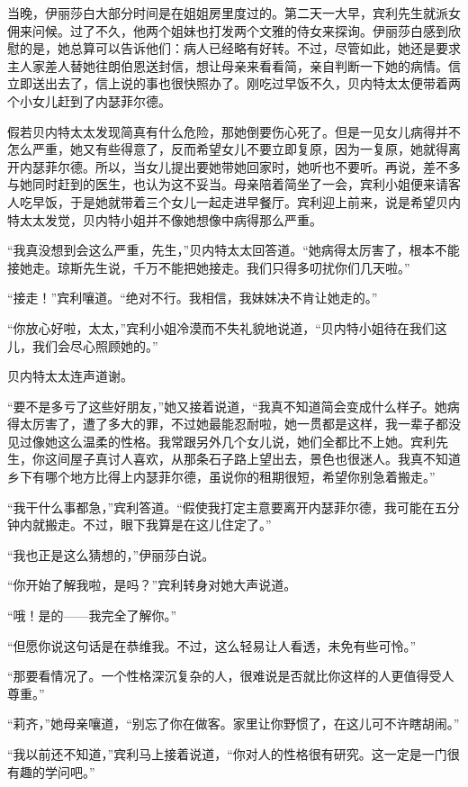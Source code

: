 \par 当晚，伊丽莎白大部分时间是在姐姐房里度过的。第二天一大早，宾利先生就派女佣来问候。过了不久，他两个姐妹也打发两个文雅的侍女来探询。伊丽莎白感到欣慰的是，她总算可以告诉他们：病人已经略有好转。不过，尽管如此，她还是要求主人家差人替她往朗伯恩送封信，想让母亲来看看简，亲自判断一下她的病情。信立即送出去了，信上说的事也很快照办了。刚吃过早饭不久，贝内特太太便带着两个小女儿赶到了内瑟菲尔德。
\par 假若贝内特太太发现简真有什么危险，那她倒要伤心死了。但是一见女儿病得并不怎么严重，她又有些得意了，反而希望女儿不要立即复原，因为一复原，她就得离开内瑟菲尔德。所以，当女儿提出要她带她回家时，她听也不要听。再说，差不多与她同时赶到的医生，也认为这不妥当。母亲陪着简坐了一会，宾利小姐便来请客人吃早饭，于是她就带着三个女儿一起走进早餐厅。宾利迎上前来，说是希望贝内特太太发觉，贝内特小姐并不像她想像中病得那么严重。
\par “我真没想到会这么严重，先生，”贝内特太太回答道。“她病得太厉害了，根本不能接她走。琼斯先生说，千万不能把她接走。我们只得多叨扰你们几天啦。”
\par “接走！”宾利嚷道。“绝对不行。我相信，我妹妹决不肯让她走的。”
\par “你放心好啦，太太，”宾利小姐冷漠而不失礼貌地说道，“贝内特小姐待在我们这儿，我们会尽心照顾她的。”
\par 贝内特太太连声道谢。
\par “要不是多亏了这些好朋友，”她又接着说道，“我真不知道简会变成什么样子。她病得太厉害了，遭了多大的罪，不过她最能忍耐啦，她一贯都是这样，我一辈子都没见过像她这么温柔的性格。我常跟另外几个女儿说，她们全都比不上她。宾利先生，你这间屋子真讨人喜欢，从那条石子路上望出去，景色也很迷人。我真不知道乡下有哪个地方比得上内瑟菲尔德，虽说你的租期很短，希望你别急着搬走。”
\par “我干什么事都急，”宾利答道。“假使我打定主意要离开内瑟菲尔德，我可能在五分钟内就搬走。不过，眼下我算是在这儿住定了。”
\par “我也正是这么猜想的，”伊丽莎白说。
\par “你开始了解我啦，是吗？”宾利转身对她大声说道。
\par “哦！是的——我完全了解你。”
\par “但愿你说这句话是在恭维我。不过，这么轻易让人看透，未免有些可怜。”
\par “那要看情况了。一个性格深沉复杂的人，很难说是否就比你这样的人更值得受人尊重。”
\par “莉齐，”她母亲嚷道，“别忘了你在做客。家里让你野惯了，在这儿可不许瞎胡闹。”
\par “我以前还不知道，”宾利马上接着说道，“你对人的性格很有研究。这一定是一门很有趣的学问吧。”
